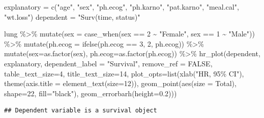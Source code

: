 \documentclass[
]{article}
\newenvironment{Shaded}{\begin{snugshade}}{\end{snugshade}}
\newcommand{\AttributeTok}[1]{\textcolor[rgb]{0.77,0.63,0.00}{#1}}
\newcommand{\ConstantTok}[1]{\textcolor[rgb]{0.00,0.00,0.00}{#1}}
\newcommand{\DecValTok}[1]{\textcolor[rgb]{0.00,0.00,0.81}{#1}}
\newcommand{\FloatTok}[1]{\textcolor[rgb]{0.00,0.00,0.81}{#1}}
\newcommand{\FunctionTok}[1]{\textcolor[rgb]{0.00,0.00,0.00}{#1}}
\newcommand{\NormalTok}[1]{#1}
\newcommand{\OtherTok}[1]{\textcolor[rgb]{0.56,0.35,0.01}{#1}}
\newcommand{\SpecialCharTok}[1]{\textcolor[rgb]{0.00,0.00,0.00}{#1}}
\newcommand{\StringTok}[1]{\textcolor[rgb]{0.31,0.60,0.02}{#1}}
\begin{document}
\begin{Shaded}
\begin{Highlighting}[]
\NormalTok{explanatory }\OtherTok{=} \FunctionTok{c}\NormalTok{(}\StringTok{"age"}\NormalTok{, }\StringTok{"sex"}\NormalTok{, }\StringTok{"ph.ecog"}\NormalTok{, }\StringTok{"ph.karno"}\NormalTok{, }\StringTok{"pat.karno"}\NormalTok{, }\StringTok{"meal.cal"}\NormalTok{, }\StringTok{"wt.loss"}\NormalTok{)}
\NormalTok{dependent }\OtherTok{=} \StringTok{"Surv(time, status)"}

\NormalTok{lung }\SpecialCharTok{\%\textgreater{}\%}
  \FunctionTok{mutate}\NormalTok{(}\AttributeTok{sex =} \FunctionTok{case\_when}\NormalTok{(sex }\SpecialCharTok{==} \DecValTok{2} \SpecialCharTok{\textasciitilde{}} \StringTok{"Female"}\NormalTok{,}
\NormalTok{                         sex }\SpecialCharTok{==} \DecValTok{1} \SpecialCharTok{\textasciitilde{}} \StringTok{"Male"}\NormalTok{)) }\SpecialCharTok{\%\textgreater{}\%}
  \FunctionTok{mutate}\NormalTok{(}\AttributeTok{ph.ecog =} \FunctionTok{ifelse}\NormalTok{(ph.ecog }\SpecialCharTok{==} \DecValTok{3}\NormalTok{, }\DecValTok{2}\NormalTok{, ph.ecog)) }\SpecialCharTok{\%\textgreater{}\%}
  \FunctionTok{mutate}\NormalTok{(}\AttributeTok{sex=}\FunctionTok{as.factor}\NormalTok{(sex), }
         \AttributeTok{ph.ecog=}\FunctionTok{as.factor}\NormalTok{(ph.ecog)) }\SpecialCharTok{\%\textgreater{}\%}
  \FunctionTok{hr\_plot}\NormalTok{(dependent, }
\NormalTok{          explanatory, }
          \AttributeTok{dependent\_label =} \StringTok{"Survival"}\NormalTok{,}
          \AttributeTok{remove\_ref =} \ConstantTok{FALSE}\NormalTok{,}
          \AttributeTok{table\_text\_size=}\DecValTok{4}\NormalTok{, }\AttributeTok{title\_text\_size=}\DecValTok{14}\NormalTok{,}
          \AttributeTok{plot\_opts=}\FunctionTok{list}\NormalTok{(}\FunctionTok{xlab}\NormalTok{(}\StringTok{"HR, 95\% CI"}\NormalTok{), }
                         \FunctionTok{theme}\NormalTok{(}\AttributeTok{axis.title =} \FunctionTok{element\_text}\NormalTok{(}\AttributeTok{size=}\DecValTok{12}\NormalTok{)),}
                         \FunctionTok{geom\_point}\NormalTok{(}\FunctionTok{aes}\NormalTok{(}\AttributeTok{size =}\NormalTok{ Total), }\AttributeTok{shape=}\DecValTok{22}\NormalTok{, }\AttributeTok{fill=}\StringTok{"black"}\NormalTok{),}
                         \FunctionTok{geom\_errorbarh}\NormalTok{(}\AttributeTok{height=}\FloatTok{0.2}\NormalTok{)))}
\end{Highlighting}
\end{Shaded}

\begin{verbatim}
## Dependent variable is a survival object
\end{verbatim}
\end{document}

